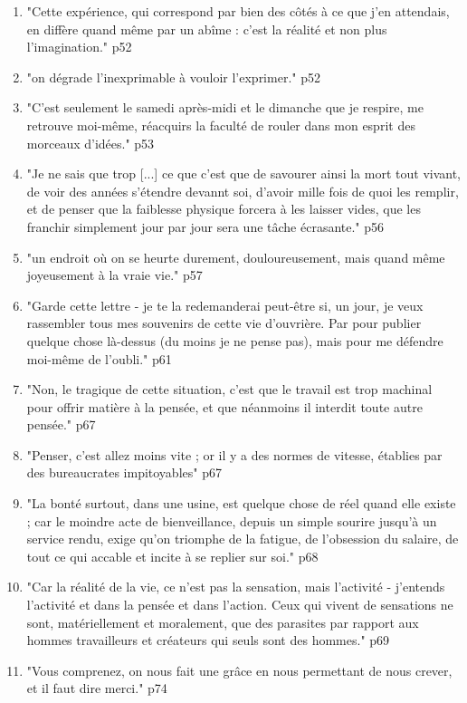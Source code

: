 \documentclass[a4paper,12pt]{book}
\newcommand{\Cit}[2]{\begin{tcolorbox}[sharp corners, colback=white,colframe=red!90!black!75, title=Citations : #1]#2\end{tcolorbox}}
\begin{document}
\Cit{La Condition Ouvrière 1}{\begin{enumerate}
\item "Cette expérience, qui correspond par bien des côtés à ce que j'en attendais, en diffère quand même par un abîme : c'est la réalité et non plus l'imagination." p52
\item "on dégrade l'inexprimable à vouloir l'exprimer." p52
\item "C'est seulement le samedi après-midi et le dimanche que je respire, me retrouve moi-même, réacquirs la faculté de rouler dans mon esprit des morceaux d'idées." p53
\item "Je ne sais que trop [...] ce que c'est que de savourer ainsi la mort tout vivant, de voir des années s'étendre devannt soi, d'avoir mille fois de quoi les remplir, et de penser que la faiblesse physique forcera à les laisser vides, que les franchir simplement jour par jour sera une tâche écrasante." p56
\item "un endroit où on se heurte durement, douloureusement, mais quand même joyeusement à la vraie vie." p57
\item "Garde cette lettre - je te la redemanderai peut-être si, un jour, je veux rassembler tous mes souvenirs de cette vie d'ouvrière. Par pour publier quelque chose là-dessus (du moins je ne pense pas), mais pour me défendre moi-même de l'oubli." p61
\item "Non, le tragique de cette situation, c'est que le travail est trop machinal pour offrir matière à la pensée, et que néanmoins il interdit toute autre pensée." p67
\item "Penser, c'est allez moins vite ; or il y a des normes de vitesse, établies par des bureaucrates impitoyables" p67
\item "La bonté surtout, dans une usine, est quelque chose de réel quand elle existe ; car le moindre acte de bienveillance, depuis un simple sourire jusqu'à un service rendu, exige qu'on triomphe de la fatigue, de l'obsession du salaire, de tout ce qui accable et incite à se replier sur soi." p68
\item "Car la réalité de la vie, ce n'est pas la sensation, mais l'activité - j'entends l'activité et dans la pensée et dans l'action. Ceux qui vivent de sensations ne sont, matériellement et moralement, que des parasites par rapport aux hommes travailleurs et créateurs qui seuls sont des hommes." p69
\item "Vous comprenez, on nous fait une grâce en nous permettant de nous crever, et il faut dire merci." p74 

\end{enumerate}}
\end{document}
